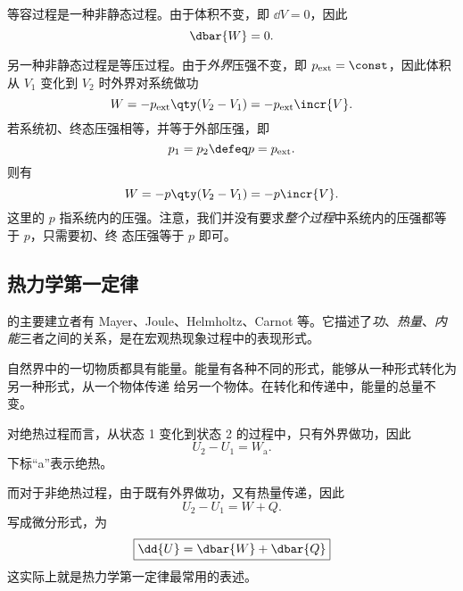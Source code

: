 等容过程是一种非静态过程。由于体积不变，即 $\dd{V} = 0$，因此
\begin{equation} \label{eq:work-fixed-V}
  \dbar{W} = 0.
\end{equation}

另一种非静态过程是等压过程。由于\emph{外界}压强不变，即 $p_\text{ext}=\const$，因此体积从 $V_1$ 变化到 $V_2$ 时外界对系统做功
\begin{equation}
  W = -p_\text{ext} \qty(V_2 - V_1) = -p_\text{ext} \incr{V}.
\end{equation}
若系统初、终态压强相等，并等于外部压强，即
\begin{equation}
  p_1 = p_2 \defeq p = p_\text{ext} .
\end{equation}
则有
\begin{equation} \label{eq:work-fixed-p}
  W = -p \qty(V_2 - V_1) = -p \incr{V}.
\end{equation}
这里的 $p$ 指系统内的压强。注意，我们并没有要求\emph{整个过程}中系统内的压强都等于 $p$，只需要初、终
态压强等于 $p$ 即可。

\subsection{热力学第一定律}

的主要建立者有 Mayer、Joule、Helmholtz、Carnot 等。它描述了\emph{功}、\emph{热量}、\emph{内能}三者之间的关系，是在宏观热现象过程中的表现形式。

\begin{theorem}[能量守恒定律]
  自然界中的一切物质都具有能量。能量有各种不同的形式，能够从一种形式转化为另一种形式，从一个物体传递
  给另一个物体。在转化和传递中，能量的总量不变。
\end{theorem}

对绝热过程而言，从状态 1 变化到状态 2 的过程中，只有外界做功，因此
\begin{equation}
  U_2 - U_1 = W_\text{a}.
\end{equation}
下标“a”表示绝热。

而对于非绝热过程，由于既有外界做功，又有热量传递，因此
\begin{equation} \label{eq:first-law-integral-form}
  U_2 - U_1 = W + Q.
\end{equation}
写成微分形式，为
\begin{equation} \label{eq:first-law-differential-form}
  \boxed{\dd{U} = \dbar{W} + \dbar{Q}}
\end{equation}
这实际上就是热力学第一定律最常用的表述。

